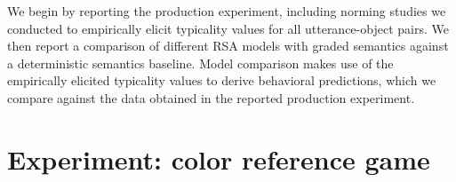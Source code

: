 \documentclass[10pt,letterpaper]{article}
\begin{document}
We begin by reporting the production experiment, including norming studies we conducted to empirically elicit typicality values for all utterance-object pairs. We then report a comparison of different RSA models with graded semantics against a deterministic semantics baseline. Model comparison makes use of the empirically elicited typicality values to derive behavioral predictions, which we compare against the data obtained in the reported production experiment.


\section{Experiment: color reference game}
\end{document}
